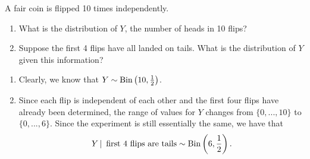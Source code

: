 \documentclass[notoc,notitlepage]{tufte-book}
\begin{document}
\begin{eg}\label{eg:basic_conditional_probability}
  A fair coin is flipped 10 times independently.
  \begin{enumerate}
    \item What is the distribution of $Y$, the number of heads in 10 flips?
    \item Suppose the first 4 flips have all landed on tails. What is the distribution of $Y$ given this information?
  \end{enumerate}

  \begin{solution}
    \begin{enumerate}
      \item Clearly, we know that $Y \sim \operatorname{Bin} \left(10, \frac{1}{2}\right)$.
      \item Since each flip is independent of each other and the first four flips have already been determined, the range of values for $Y$ changes from $\{0,...,10\}$ to $\{0, ..., 6\}$. Since the experiment is still essentially the same, we have that
      \begin{equation*}
        Y \, | \, \text{ first 4 flips are tails} \sim \operatorname{Bin} \left( 6, \frac{1}{2} \right).
      \end{equation*}
    \end{enumerate}
  \end{solution}
\end{eg}
\end{document}
